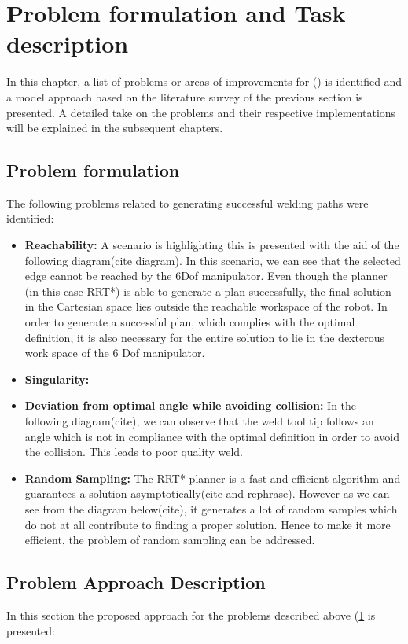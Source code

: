 \newpage
\section{Problem formulation and Task description}
\label{sec:pf}
In this chapter, a list of problems or areas of improvements for (\citet{DiazP2016}) is identified and a model approach based on the literature survey of the previous section is presented. A detailed take on the problems and their respective implementations will be explained in the subsequent chapters.
\subsection{Problem formulation}
The following problems related to generating successful welding paths were identified:
\begin{itemize}
\item \textbf{Reachability:} A scenario is highlighting this is presented with the aid of the following diagram(cite diagram). In this scenario, we can see that the selected edge cannot be reached by the 6Dof manipulator. Even though the planner (in this case RRT*) is able to generate a plan successfully, the final solution in the Cartesian space lies outside the reachable workspace of the robot. In order to generate a successful plan, which complies with the optimal definition, it is also necessary for the entire solution to lie in the dexterous work space of the 6 Dof manipulator.
\item \textbf{Singularity:}
\item \textbf{Deviation from optimal angle while avoiding collision:} In the following diagram(cite), we can observe that the weld tool tip follows an angle which is not in compliance with the optimal definition in order to avoid the collision. This leads to poor quality weld.
\item \textbf{Random Sampling:} The RRT* planner is a fast and efficient algorithm and guarantees  a solution asymptotically(cite and rephrase). However as we can see from the diagram below(cite), it generates a lot of random samples which do not at all contribute to finding a proper solution. Hence to make it more efficient, the problem of random sampling can be addressed.
\end{itemize}


\subsection{Problem Approach Description}
In this section the proposed approach for the problems described above (\ref{sec:pf} is presented:

